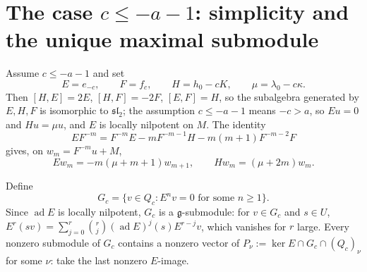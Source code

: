 \documentclass[11pt,a4paper]{article}
\newcommand{\g}{\mathfrak g}
\newcommand{\slc}{\mathfrak{sl}_2}
\newcommand{\ad}{\operatorname{ad}}
\begin{document}
\section{The case \texorpdfstring{$c\le-a-1$}{c<=-a-1}: simplicity and the unique maximal submodule}
\label{sec:case-D}

Assume $c\le-a-1$ and set
\begin{equation}\label{eq:EHF}
 E=e_{-c},\qquad F=f_c,\qquad H=h_0-cK,\qquad \mu=\lambda_0-c\kappa.
\end{equation}
Then $[H,E]=2E$, $[H,F]=-2F$, $[E,F]=H$, so the subalgebra generated by
$E,H,F$ is isomorphic to $\slc$; the assumption $c\le-a-1$ means $-c>a$,
so $Eu=0$ and $Hu=\mu u$, and $E$ is locally nilpotent on $M$. The identity
\begin{equation}\label{eq:triple}
 EF^{-m}=F^{-m}E-mF^{-m-1}H-m(m+1)F^{-m-2}F
\end{equation}
gives, on $w_m=F^{-m}u+M$,
\begin{equation}\label{eq:pure}
 Ew_m=-m(\mu+m+1)w_{m+1},\qquad Hw_m=(\mu+2m)w_m.
\end{equation}

Define
\[
 G_c=\{v\in Q_c:E^nv=0\text{ for some }n\ge1\}.
\]
Since $\ad E$ is locally nilpotent, $G_c$ is a $\g$-submodule: for
$v\in G_c$ and $s\in U$,
$E^r(sv)=\sum_{j=0}^{r}\binom rj(\ad E)^j(s)E^{r-j}v$, which vanishes for
$r$ large. Every nonzero submodule of $G_c$ contains a nonzero vector of
$P_\nu:=\ker E\cap G_c\cap(Q_c)_\nu$ for some $\nu$: take the last
nonzero $E$-image.
\end{document}
